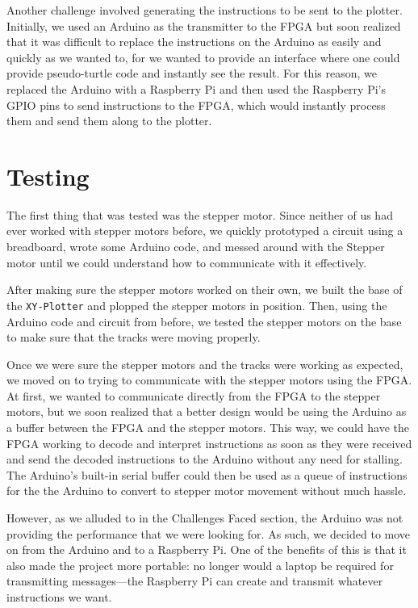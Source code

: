 \documentclass[12pt]{article}
\begin{document}
Another challenge involved generating the instructions to be sent to the plotter. Initially, we used an Arduino as the transmitter to the FPGA but soon realized that it was difficult to replace the instructions on the Arduino as easily and quickly as we wanted to, for we wanted to provide an interface where one could provide pseudo-turtle code and instantly see the result. For this reason, we replaced the Arduino with a Raspberry Pi and then used the Raspberry Pi's GPIO pins to send instructions to the FPGA, which would instantly process them and send them along to the plotter.

\section{Testing}
The first thing that was tested was the stepper motor. Since neither of us had ever worked with stepper motors before, we quickly prototyped a circuit using a breadboard, wrote some Arduino code, and messed around with the Stepper motor until we could understand how to communicate with it effectively. 

After making sure the stepper motors worked on their own, we built the base of the {\tt XY-Plotter} and plopped the stepper motors in position. Then, using the Arduino code and circuit from before, we tested the stepper motors on the base to make sure that the tracks were moving properly.

Once we were sure the stepper motors and the tracks were working as expected, we moved on to trying to communicate with the stepper motors using the FPGA. At first, we wanted to communicate directly from the FPGA to the stepper motors, but we soon realized that a better design would be using the Arduino as a buffer between the FPGA and the stepper motors. This way, we could have the FPGA working to decode and interpret instructions as soon as they were received and send the decoded instructions to the Arduino without any need for stalling. The Arduino's built-in serial buffer could then be used as a queue of instructions for the the Arduino to convert to stepper motor movement without much hassle.

However, as we alluded to in the Challenges Faced section, the Arduino was not providing the performance that we were looking for. As such, we decided to move on from the Arduino and to a Raspberry Pi. One of the benefits of this is that it also made the project more portable: no longer would a laptop be required for transmitting messages---the Raspberry Pi can create and transmit whatever instructions we want.
\end{document}
